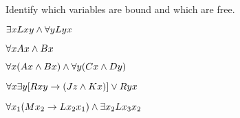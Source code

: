 \begin{practiceproblems}
\problempart
\label{pr.freeFOL}
Identify which variables are bound and which are free.
\begin{earg}
\item $\exists x Lxy \mathbin{\wedge} \forall y Lyx$
\item $\forall x Ax \mathbin{\wedge} Bx$
\item $\forall x (Ax \mathbin{\wedge} Bx) \mathbin{\wedge} \forall y(Cx \mathbin{\wedge} Dy)$
\item $\forall x\exists y[Rxy \rightarrow (Jz \mathbin{\wedge} Kx)] \vee Ryx$
\item $\forall x_1(Mx_2 \rightarrow Lx_2x_1) \mathbin{\wedge} \exists x_2 Lx_3x_2$
\end{earg}


\end{practiceproblems}






